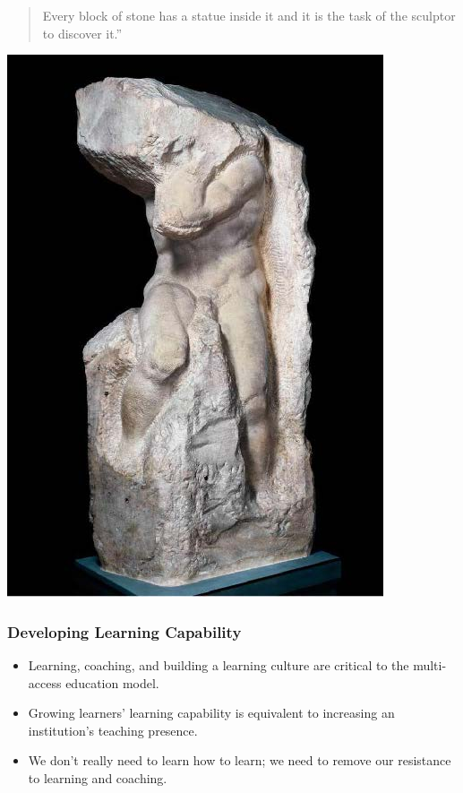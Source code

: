 \documentclass[
]{book}
\providecommand{\tightlist}{%
  \setlength{\itemsep}{0pt}\setlength{\parskip}{0pt}}
\begin{document}
\begin{quote}
Every block of stone has a statue inside it and it is the task of the sculptor to discover it.''
\end{quote}

\includegraphics{assets/presentations/coaching/mike.jpg}

\hypertarget{developing-learning-capability}{%
\subsubsection*{Developing Learning Capability}\label{developing-learning-capability}}

\begin{itemize}
\tightlist
\item
  Learning, coaching, and building a learning culture are critical to the multi-access education model.
\item
  Growing learners' learning capability is equivalent to increasing an institution's teaching presence.
\item
  We don't really need to learn how to learn; we need to remove our resistance to learning and coaching.
\end{itemize}
\end{document}
